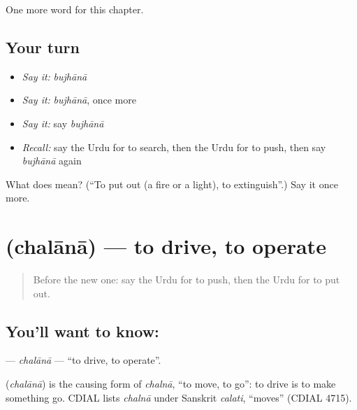 \begin{grammarlens}[title={What you've built}]
One more word for this chapter.
\end{grammarlens}

\subsection*{Your turn}
\begin{itemize}
\raggedright
  \item \emph{Say it:} \emph{bujhānā}
  \item \emph{Say it:} \emph{bujhānā}, once more
  \item \emph{Say it:} say \emph{bujhānā}
  \item \emph{Recall:} say the Urdu for to search, then the Urdu for to push, then say \emph{bujhānā} again
\end{itemize}

\begin{tcolorbox}[breakable,colback=teal!4,colframe=teal!35!black,title={Before you move on}]
What does  mean? (\textquotedblleft{}To put out (a fire or a light), to extinguish\textquotedblright{}.) Say it once more.
\end{tcolorbox}
\section[\texorpdfstring{\ur{چلانا} (chalānā)}{چلانا (chalānā)}]{ (chalānā) — to drive, to operate}

\label{lesson:UR-C240-chalana}



\begin{quote}
Before the new one: say the Urdu for to push, then the Urdu for to put out.
\end{quote}

\subsection*{You'll want to know: }
\textbf{} — \emph{chalānā} — \textquotedblleft{}to drive, to operate\textquotedblright{}.

\begin{cousinweb}
\textbf{} (\emph{chalānā}) is the causing form of \emph{chalnā}, \textquotedblleft{}to move, to go\textquotedblright{}: to drive is to make something go. CDIAL lists \emph{chalnā} under Sanskrit \emph{calati}, \textquotedblleft{}moves\textquotedblright{} (CDIAL 4715).
\end{cousinweb}

